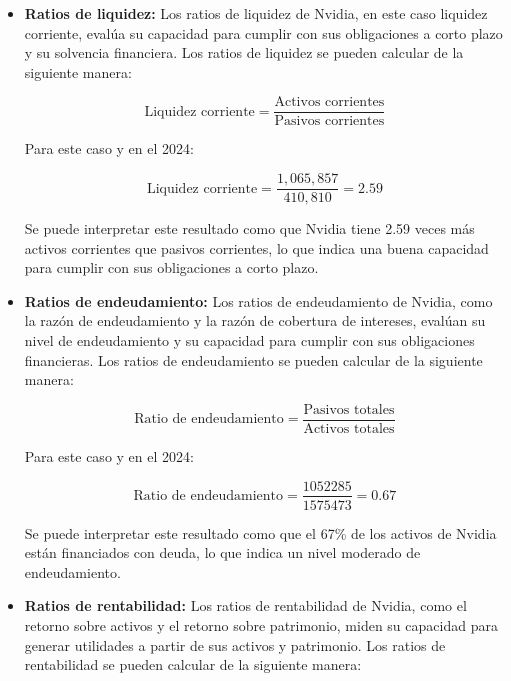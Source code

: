 \documentclass{article}
\begin{document}
\begin{itemize}
  \item \textbf{Ratios de liquidez:} Los ratios de liquidez de Nvidia, en este caso liquidez corriente, evalúa su capacidad para cumplir con sus obligaciones a corto plazo y su solvencia financiera. Los ratios de liquidez se pueden calcular de la siguiente manera:
  
  \begin{equation}
    \text{Liquidez corriente} = \frac{\text{Activos corrientes}}{\text{Pasivos corrientes}}
\end{equation}

Para este caso y en el 2024:

\begin{equation}
    \text{Liquidez corriente} = \frac{1,065,857}{410,810} = 2.59
\end{equation}


  Se puede interpretar este resultado como que Nvidia tiene 2.59 veces más activos corrientes que pasivos corrientes, lo que indica una buena capacidad para cumplir con sus obligaciones a corto plazo.

  \item \textbf{Ratios de endeudamiento:} Los ratios de endeudamiento de Nvidia, como la razón de endeudamiento y la razón de cobertura de intereses, evalúan su nivel de endeudamiento y su capacidad para cumplir con sus obligaciones financieras. Los ratios de endeudamiento se pueden calcular de la siguiente manera:
  
  \begin{equation}
    \text{Ratio de endeudamiento} = \frac{\text{Pasivos totales}}{\text{Activos totales}}
  \end{equation}

  Para este caso y en el 2024:

  \begin{equation}
      \text{Ratio de endeudamiento} = \frac{1052285}{1575473} = 0.67
  \end{equation}

  Se puede interpretar este resultado como que el 67\% de los activos de Nvidia están financiados con deuda, lo que indica un nivel moderado de endeudamiento.

  \item \textbf{Ratios de rentabilidad:} Los ratios de rentabilidad de Nvidia, como el retorno sobre activos y el retorno sobre patrimonio, miden su capacidad para generar utilidades a partir de sus activos y patrimonio. Los ratios de rentabilidad se pueden calcular de la siguiente manera:
  

\end{itemize}
\end{document}
